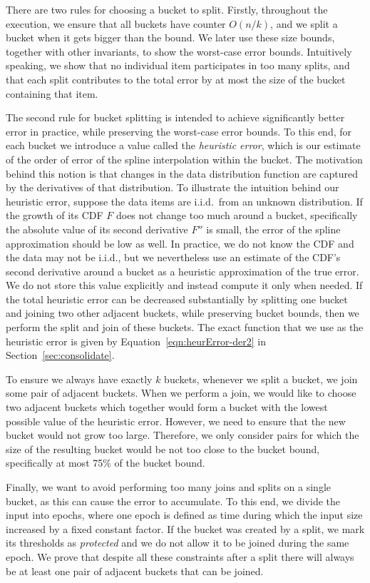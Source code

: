 \documentclass[acmsmall]{acmart}
\theoremstyle{remark}
\begin{document}
There are two rules for choosing a bucket to split.
Firstly, throughout the execution, we ensure that all buckets have counter $O(n/k)$, and we split a bucket when it gets bigger than the bound. %
We later use these size bounds, together with other invariants, to show the worst-case error bounds. 
Intuitively speaking, we show that no individual item participates in too many splits, and that each split contributes to the total error by at most the size of the bucket containing that item.

The second rule for bucket splitting is intended to achieve significantly better error in practice, while preserving the worst-case error bounds. 
To this end, for each bucket we introduce a value called the \emph{heuristic error}, which is our estimate of the order of error of the spline interpolation within the bucket.
The motivation behind this notion is that changes in the data distribution function are captured by the derivatives of that distribution.
To illustrate the intuition behind our heuristic error, suppose the data items are i.i.d.\ from an unknown distribution. 
If the growth of its CDF $F$ does not change too much around a bucket, specifically the absolute value of its second derivative $F''$ is small, the error of the spline approximation should be low as well.
In practice, we do not know the CDF and the data may not be i.i.d., but we nevertheless use an estimate of the CDF's second derivative around a bucket as a heuristic approximation of the true error.
We do not store this value explicitly and instead compute it only when needed.
If the total heuristic error can be decreased substantially by splitting one bucket and joining two other adjacent buckets, while preserving bucket bounds, then we perform the split and join of these buckets. 
The exact function that we use as the heuristic error is given by Equation~\ref{eqn:heurError-der2} in Section~\ref{sec:consolidate}.

To ensure we always have exactly $k$ buckets, whenever we split a bucket, we join some pair of adjacent buckets.
When we perform a join, we would like to choose two adjacent buckets which together would form a bucket with the lowest possible value of the heuristic error.
However, we need to ensure that the new bucket would not grow too large.
Therefore, we only consider pairs for which the size of the resulting bucket would be not too close to the bucket bound, specifically 
at most 75\% of the bucket bound.


Finally, we want to avoid performing too many joins and splits on a single bucket, as this can cause the error to accumulate.
To this end, we divide the input into epochs, where one epoch is defined as time during which the input size increased by a fixed constant factor.
If the bucket was created by a split, we mark its thresholds as \emph{protected} and we do not allow it to be joined during the same epoch.
We prove that despite all these constraints after a split there will always be at least one pair of adjacent buckets that can be joined.
\end{document}
